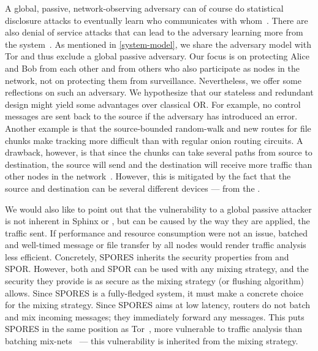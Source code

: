 A global, passive, network-observing adversary can of course do
statistical disclosure attacks to eventually learn who communicates
with whom~\cite{StatisticalDisclosureAttacks}. There are also denial
of service attacks that can lead to the adversary learning more from
the system~\cite{DenialOfSecurity}.  As mentioned in
\cref{system-model}, we share the adversary model with Tor
and thus exclude a global passive adversary. Our focus is on
protecting Alice and Bob from each other and from others who also
participate as nodes in the network, not on protecting them from
surveillance. Nevertheless, we offer some reflections on such an
adversary. We hypothesize that our stateless and redundant design
might yield some advantages over classical \ac{OR}. For
example, no control messages are sent back to the source if the
adversary has introduced an error.     Another example is that the source-bounded
random-walk and new routes for file chunks make tracking more
difficult than with regular onion routing circuits. A drawback, however, is
that since the chunks can take several paths from source to destination, the source 
will send and the destination will receive more traffic than other nodes in the 
network~\cite{RoutingSurveyAnonymousProtocols}. However, this is mitigated by the fact that the source and 
destination can be several different devices --- \ie from the \squads.


We would also like to point out that the
vulnerability to a global passive attacker is not inherent in Sphinx
or \Sphinxes, but can be caused by the way they are applied, \ie the
traffic sent. If performance and resource consumption were not an
issue, batched and well-timed message or file transfer by all nodes
would render traffic analysis less efficient. Concretely, \Ac{SPORES} inherits 
the security properties from \Sphinxes and \ac{SPOR}.
However, both \Sphinxes and \ac{SPOR} can be used with any mixing strategy, and 
the security they provide is as secure as the mixing strategy (or flushing 
algorithm) allows.
Since \ac{SPORES} is a fully-fledged system, it must make a concrete choice for 
the mixing strategy.
Since \ac{SPORES} aims at low latency, routers do not batch and mix incoming 
messages; they immediately forward any messages.
This puts \ac{SPORES} in the same position as Tor~\cite{Tor}, \ie more 
vulnerable to traffic analysis than batching 
mix-nets~\cite{RoutingSurveyAnonymousProtocols}  --- this vulnerability is inherited 
from the mixing strategy.





